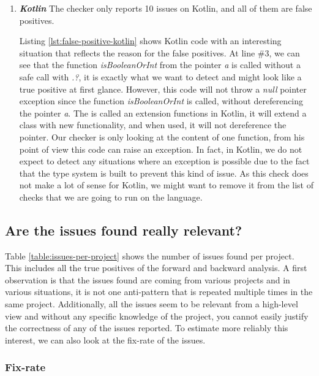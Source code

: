 \begin{enumerate}
	\item \textbf{\textit{Kotlin}}
	The checker only reports 10 issues on Kotlin, and all of them are false positives.
	
	
	
	Listing \ref{lst:false-positive-kotlin} shows Kotlin code with an interesting situation that reflects the reason for the false positives. 
	At line $\#3$, we can see that the function \emph{isBooleanOrInt} from the pointer \emph{a} is called without a safe call with \emph{.?}, it is exactly what we want to detect and might look like a true positive at first glance. 
	However, this code will not throw a \emph{null} pointer exception since the function \emph{isBooleanOrInt} is called, without dereferencing the pointer \emph{a}.
	The is called an extension functions \cite{kotlinExtensionFun:2019:Online} in Kotlin, it will extend a class with new functionality, and when used, it will not dereference the pointer.
	Our checker is only looking at the content of one function, from his point of view this code can raise an exception.
	In fact, in Kotlin, we do not expect to detect any situations where an exception is possible due to the fact that the type system is built to prevent this kind of issue.
	As this check does not make a lot of sense for Kotlin, we might want to remove it from the list of checks that we are going to run on the language.
\end{enumerate}

\subsection{Are the issues found really relevant?}
\label{subsec:are_the_issues_relevant}

Table \ref{table:issues-per-project} shows the number of issues found per project. 
This includes all the true positives of the forward and backward analysis. 
A first observation is that the issues found are coming from various projects and in various situations, it is not one anti-pattern that is repeated multiple times in the same project. 
Additionally, all the issues seem to be relevant from a high-level view and without any specific knowledge of the project, you cannot easily justify the correctness of any of the issues reported.
To estimate more reliably this interest, we can also look at the fix-rate of the issues.

\subsubsection{Fix-rate}
\label{subsubsec:fix_rate}


